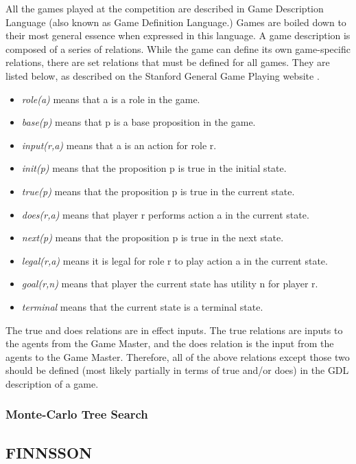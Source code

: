 \documentclass[letterpaper]{article}
\begin{document}
All the games played at the competition are described in Game Description Language (also known as Game Definition Language.) Games are boiled down to their most general essence when expressed in this language. A game description is composed of a series of relations. While the game can define its own game-specific relations, there are set relations that must be defined for all games. They are listed below, as described on the Stanford General Game Playing website \cite{StanfordGGP}.
\begin{itemize}
\item \emph{role(a)} means that a is a role in the game.
\item \emph{base(p)} means that p is a base proposition in the game.
\item \emph{input(r,a)} means that a is an action for role r.
\item \emph{init(p)} means that the proposition p is true in the initial state.
\item \emph{true(p)} means that the proposition p is true in the current state.
\item \emph{does(r,a)} means that player r performs action a in the current state.
\item \emph{next(p)} means that the proposition p is true in the next state.
\item \emph{legal(r,a)} means it is legal for role r to play action a in the current state.
\item \emph{goal(r,n)} means that player the current state has utility n for player r.
\item \emph{terminal} means that the current state is a terminal state.
\end{itemize}

The true and does relations are in effect inputs. The true relations are inputs to the agents from the Game Master, and the does relation is the input from the agents to the Game Master. Therefore, all of the above relations except those two should be defined (most likely partially in terms of true and/or does) in the GDL description of a game.

\subsubsection{Monte-Carlo Tree Search}

\subsection{FINNSSON}
\end{document}
